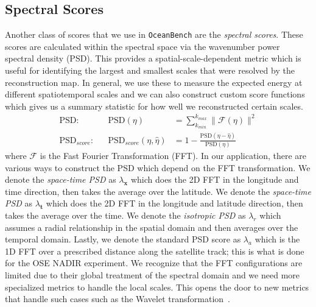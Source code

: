 \subsection{Spectral Scores}

Another class of scores that we use in \texttt{OceanBench} are the \textit{spectral scores}. These scores are calculated within the spectral space via the wavenumber power spectral density (PSD). 
This provides a spatial-scale-dependent metric which is useful for identifying the largest and smallest scales that were resolved by the reconstruction map. 
In general, we use these to measure the expected energy at different spatiotemporal scales and we can also construct custom score functions which gives us a summary statistic for how well we reconstructed certain scales.
%
\begin{align}
    \text{PSD}: &&\text{PSD}(\eta) &= \sum_{k_{min}}^{k_{max}}\|\mathcal{\mathcal{F}(\eta)}\|^2\label{psd}\\
    \text{PSD}_{score}: &&\text{PSD}_{score}(\eta,\hat{\eta}) &= 1 - \frac{\text{PSD}(\eta - \hat{\eta})}{\text{PSD}(\eta)} \label{eq:psd_score}
\end{align}
%
where $\mathcal{F}$ is the Fast Fourier Transformation (FFT). 
In our application, there are various ways to construct the PSD which depend on the FFT transformation.
We denote the \textit{space-time PSD} as $\lambda_\mathbf{x}$ which does the 2D FFT in the longitude and time direction, then takes the average over the latitude.
We denote the \textit{space-time PSD} as $\lambda_\mathbf{t}$ which does the 2D FFT in the longitude and latitude direction, then takes the average over the time.
We denote the \textit{isotropic PSD} as $\lambda_r$ which assumes a radial relationship in the spatial domain and then averages over the temporal domain.
Lastly, we denote the standard PSD score as $\lambda_a$ which is the 1D FFT over a prescribed distance along the satellite track; this is what is done for the OSE NADIR experiment.
We recognize that the FFT configurations are limited due to their global treatment of the spectral domain and we need more specialized metrics to handle the local scales.
This opens the door to new metrics that handle such cases such as the Wavelet transformation~\cite{METRICSWAVELET}.



